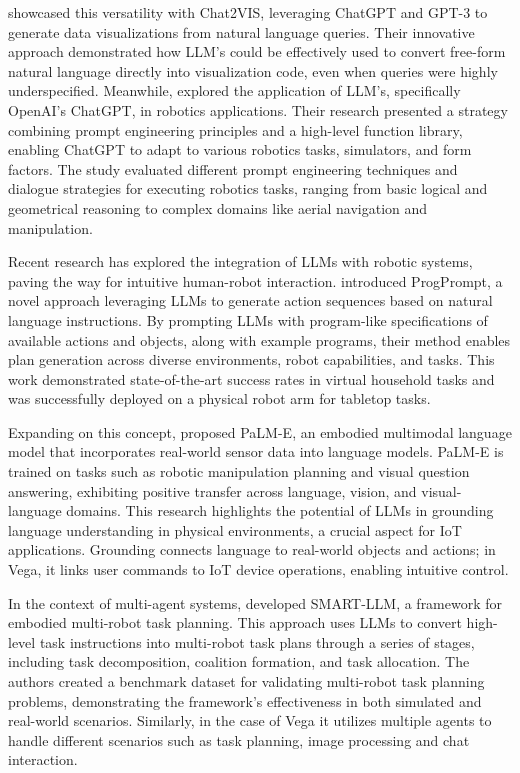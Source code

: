 \documentclass[lettersize,journal]{IEEEtran}
\begin{document}
\citet{10121440} showcased this versatility with Chat2VIS, leveraging ChatGPT and GPT-3 to generate data visualizations from natural language queries. Their innovative approach demonstrated how LLM's could be effectively used to convert free-form natural language directly into visualization code, even when queries were highly underspecified. Meanwhile, \citet{10500490} explored the application of LLM's, specifically OpenAI's ChatGPT, in robotics applications. Their research presented a strategy combining prompt engineering principles and a high-level function library, enabling ChatGPT to adapt to various robotics tasks, simulators, and form factors. The study evaluated different prompt engineering techniques and dialogue strategies for executing robotics tasks, ranging from basic logical and geometrical reasoning to complex domains like aerial navigation and manipulation.

Recent research has explored the integration of LLMs with robotic systems, paving the way for intuitive human-robot interaction. \citet{Singh2023} introduced ProgPrompt, a novel approach leveraging LLMs to generate action sequences based on natural language instructions. By prompting LLMs with program-like specifications of available actions and objects, along with example programs, their method enables plan generation across diverse environments, robot capabilities, and tasks. This work demonstrated state-of-the-art success rates in virtual household tasks and was successfully deployed on a physical robot arm for tabletop tasks.

Expanding on this concept, \citet{10.5555/3618408.3618748} proposed PaLM-E, an embodied multimodal language model that incorporates real-world sensor data into language models. PaLM-E is trained on tasks such as robotic manipulation planning and visual question answering, exhibiting positive transfer across language, vision, and visual-language domains. This research highlights the potential of LLMs in grounding language understanding in physical environments, a crucial aspect for IoT applications. Grounding connects language to real-world objects and actions; in Vega, it links user commands to IoT device operations, enabling intuitive control.

In the context of multi-agent systems, \citet{kannan2024smartllmsmartmultiagentrobot} developed SMART-LLM, a framework for embodied multi-robot task planning. This approach uses LLMs to convert high-level task instructions into multi-robot task plans through a series of stages, including task decomposition, coalition formation, and task allocation. The authors created a benchmark dataset for validating multi-robot task planning problems, demonstrating the framework's effectiveness in both simulated and real-world scenarios. Similarly, in the case of Vega it utilizes multiple agents to handle different scenarios such as task planning, image processing and chat interaction.
\end{document}
